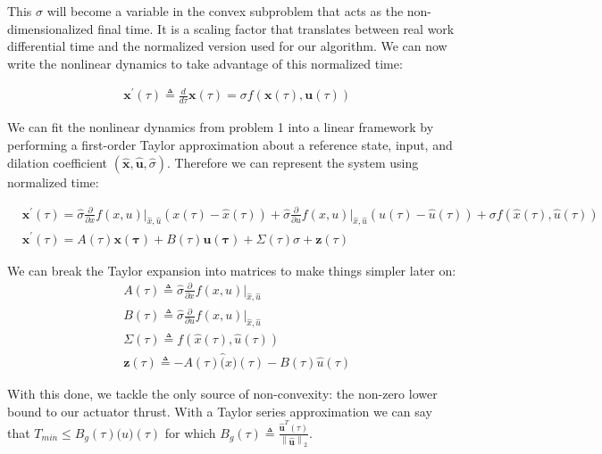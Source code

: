 This $\sigma$ will become a variable in the convex subproblem that acts as the non-dimensionalized final time. It is a scaling factor that translates between real work differential time and the normalized version used for our algorithm. We can now write the nonlinear dynamics to take advantage of this normalized time:

\begin{align}
& \mathbf{x}^\prime(\tau) \triangleq \frac{d}{d\tau}\mathbf{x}(\tau) = \sigma f(\mathbf{x}(\tau), \mathbf{u}(\tau))
\end{align}

We can fit the nonlinear dynamics from problem 1 into a linear framework by performing a first-order Taylor approximation about a reference state, input, and dilation coefficient $(\hat{\mathbf{x}}, \hat{\mathbf{u}}, \hat{\sigma})$. Therefore we can represent the system using normalized time:

\begin{align}
& \mathbf{x}^\prime(\tau) = \hat{\sigma}\frac{\partial}{\partial x} f(x,u) \bigg\rvert_{\hat{x},\hat{u}}(x(\tau)-\hat{x}(\tau)) + \hat{\sigma}\frac{\partial}{\partial u} f(x,u) \bigg\rvert_{\hat{x},\hat{u}}(u(\tau)-\hat{u}(\tau)) + \sigma f(\hat{x}(\tau),\hat{u}(\tau)) \\
& \mathbf{x}^\prime(\tau) = A(\tau)\mathbf{x(\tau)} + B(\tau)\mathbf{u(\tau)} + \Sigma(\tau)\sigma + \mathbf{z}(\tau)
\end{align}

We can break the Taylor expansion into matrices to make things simpler later on:
\begin{align}
& A(\tau) \triangleq \hat{\sigma} \frac{\partial}{\partial x} f(x,u) \bigg\rvert_{\hat{x},\hat{u}} \\
& B(\tau) \triangleq \hat{\sigma} \frac{\partial}{\partial u} f(x,u) \bigg\rvert_{\hat{x},\hat{u}} \\
& \Sigma(\tau) \triangleq f(\hat{x}(\tau),\hat{u}(\tau)) \\
& \mathbf{z}(\tau) \triangleq -A(\tau)\hat(x)(\tau) - B(\tau)\hat{u}(\tau)
\end{align}

With this done, we tackle the only source of non-convexity: the non-zero lower bound to our actuator thrust. With a Taylor series approximation we can say that $T_{min} \leq B_g(\tau)\mathbf(u)(\tau)$ for which $B_g(\tau) \triangleq \frac{\mathbf{\hat{u}}^T(\tau)}{\left\lVert \mathbf{\hat{u}} \right \lVert_2}$.



